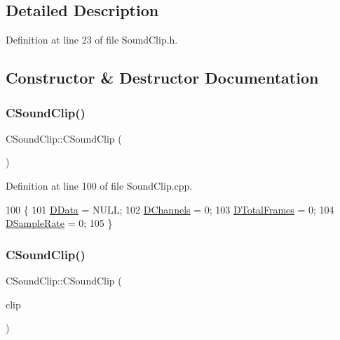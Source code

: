 \subsection{Detailed Description}


Definition at line 23 of file Sound\+Clip.\+h.



\subsection{Constructor \& Destructor Documentation}
\hypertarget{classCSoundClip_af65407e991db78fb13c6e9fdec122dd6}{}\label{classCSoundClip_af65407e991db78fb13c6e9fdec122dd6} 
\subsubsection{\texorpdfstring{C\+Sound\+Clip()}{CSoundClip()}\hspace{0.1cm}{\footnotesize\ttfamily [1/2]}}
{\footnotesize\ttfamily C\+Sound\+Clip\+::\+C\+Sound\+Clip (\begin{DoxyParamCaption}{ }\end{DoxyParamCaption})}



Definition at line 100 of file Sound\+Clip.\+cpp.


\begin{DoxyCode}
100                       \{
101     \hyperlink{classCSoundClip_a220921a0c81e5c63e2cd3c55c75878b1}{DData} = NULL;
102     \hyperlink{classCSoundClip_a01aaf0b87b9b8226c77a6931d03d6a64}{DChannels} = 0;
103     \hyperlink{classCSoundClip_ab0d9eb261d09fa2a106658276f37285b}{DTotalFrames} = 0;
104     \hyperlink{classCSoundClip_ac1b9306140da2f89f6178833e0a9b887}{DSampleRate} = 0;
105 \}
\end{DoxyCode}
\hypertarget{classCSoundClip_aa7f0a4b8587e351d3ecf952b28d4b9b3}{}\label{classCSoundClip_aa7f0a4b8587e351d3ecf952b28d4b9b3} 
\subsubsection{\texorpdfstring{C\+Sound\+Clip()}{CSoundClip()}\hspace{0.1cm}{\footnotesize\ttfamily [2/2]}}
{\footnotesize\ttfamily C\+Sound\+Clip\+::\+C\+Sound\+Clip (\begin{DoxyParamCaption}\item[{const \hyperlink{classCSoundClip}{C\+Sound\+Clip} \&}]{clip }\end{DoxyParamCaption})}



